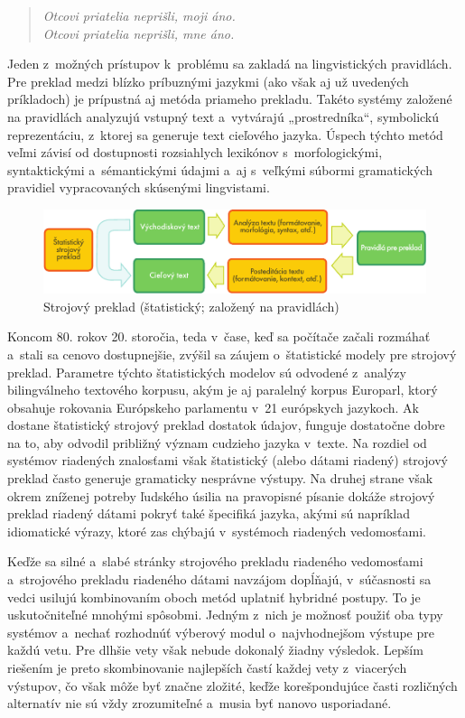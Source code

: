 \begin{multicols}{2}
\begin{verse}
\emph{Otcovi priatelia neprišli, moji áno.}\\
\smallskip
\emph{Otcovi priatelia neprišli, mne áno.}
\end{verse}

Jeden z~možných prístupov k~problému sa zakladá na lingvistických
pravidlách. Pre preklad medzi blízko príbuznými jazykmi (ako však aj
už uvedených príkladoch) je prípustná aj metóda priameho prekladu.
Takéto systémy založené na pravidlách analyzujú vstupný text
a~vytvárajú „prostredníka“, symbolickú reprezentáciu, z~ktorej
sa generuje text cieľového jazyka. Úspech týchto metód veľmi
závisí od dostupnosti rozsiahlych lexikónov
s~morfologickými, syntaktickými a~sémantickými údajmi a~aj
s~veľkými súbormi gramatických pravidiel vypracovaných
skúsenými lingvistami. 

\begin{figure}[htb]
  \center
  \includegraphics[width=\textwidth]{../_media/slovak/machine_translation}
  \caption{Strojový preklad (štatistický; založený na pravidlách)}
  \label{fig:mtarch_sk}
\end{figure}

Koncom 80. rokov 20. storočia, teda v~čase, keď sa počítače
začali rozmáhať a~stali sa cenovo dostupnejšie, zvýšil sa záujem
o~štatistické modely pre strojový preklad. Parametre týchto
štatistických modelov sú odvodené z~analýzy bilingválneho
textového korpusu, akým je aj paralelný korpus Europarl,
ktorý obsahuje rokovania Európskeho parlamentu v~21 európskych
jazykoch. Ak dostane štatistický strojový preklad dostatok údajov,
funguje dostatočne dobre na to, aby odvodil približný význam
cudzieho jazyka v~texte. Na rozdiel od systémov riadených znalosťami
však štatistický (alebo dátami riadený) strojový preklad často
generuje gramaticky nesprávne výstupy. Na druhej strane však okrem
zníženej potreby ľudského úsilia na pravopisné písanie dokáže
strojový preklad riadený dátami pokryť také špecifiká jazyka,
akými sú napríklad idiomatické výrazy, ktoré zas chýbajú
v~systémoch riadených vedomosťami. 

Keďže sa silné a~slabé stránky strojového prekladu riadeného
vedomosťami a~strojového prekladu riadeného dátami navzájom
dopĺňajú, v~súčasnosti sa vedci usilujú kombinovaním oboch metód
uplatniť hybridné postupy. To je uskutočniteľné mnohými spôsobmi.
Jedným z~nich je možnosť použiť oba typy systémov a~nechať
rozhodnúť výberový modul o~najvhodnejšom výstupe pre každú vetu.
Pre dlhšie vety však nebude dokonalý žiadny výsledok. Lepším
riešením je preto skombinovanie najlepších častí každej vety
z~viacerých výstupov, čo však môže byť značne zložité, keďže
korešpondujúce časti rozličných alternatív nie sú vždy
zrozumiteľné a~musia byť nanovo usporiadané. 


\end{multicols}
